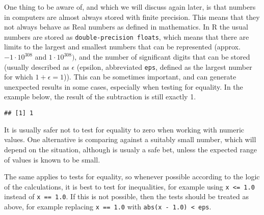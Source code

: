 \documentclass[paper=a4,10pt,div=17,headsepline,BCOR=12mm,twoside,open=right]{scrbook}\usepackage{knitr}
\begin{document}
One thing to be aware of, and which we will discuss again later, is that numbers in computers are almost always stored with finite precision. This means that they not always behave as Real numbers as defined in mathematics. In R the usual numbers are stored as \texttt{double-precision floats}, which means that there are limits to the largest and smallest numbers that can be represented (approx. $-1 \cdot 10^{308}$ and $1 \cdot 10^{308})$, and the number of significant digits that can be stored (usually described as $\epsilon$ (epsilon, abbreviated \texttt{eps}, defined as the largest number for which $ 1 + \epsilon = 1$)). This can be sometimes important, and can generate unexpected results in some cases, especially when testing for equality. In the example below, the result of the subtraction is still exactly 1. \label{par:float}

\begin{knitrout}\footnotesize
{}\color{fgcolor}\begin{kframe}
\begin{alltt}
 \hlopt{-} 
\end{alltt}
\begin{verbatim}
## [1] 1
\end{verbatim}
\end{kframe}
\end{knitrout}

It is usually safer not to test for equality to zero when working with numeric values. One alternative is comparing against a suitably small number, which will depend on the situation, although  is usualy a safe bet, unless the expected range of values is known to be small.

\begin{knitrout}\footnotesize
{}\color{fgcolor}\begin{kframe}
\begin{alltt}
 \hlopt{<} 
 \hlopt{<} 
\end{alltt}
\end{kframe}
\end{knitrout}

The same applies to tests for equality, so whenever possible according to the logic of the calculations, it is best to test for inequalities, for example using \verb|x <= 1.0| instead of \verb|x == 1.0|. If this is not possible, then the tests should be treated as above, for example replacing \verb|x == 1.0| with \verb|abs(x - 1.0) < eps|.
\end{document}
